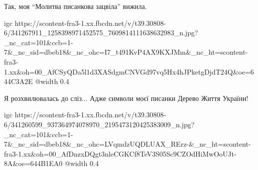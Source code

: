  
 
 
 
 

\qqSecCmt


Так, моя \enquote{Молитва писанкова зацвіла} вижила.

\ifcmt
  igc https://scontent-fra3-1.xx.fbcdn.net/v/t39.30808-6/341267911_1258398971452575_7609814111638632983_n.jpg?_nc_cat=101&ccb=1-7&_nc_sid=dbeb18&_nc_ohc=I7_t491KvP4AX9KXJMm&_nc_ht=scontent-fra3-1.xx&oh=00_AfCSyQDa5l1d3XASdgmCNVGd97vq5Hx4hJPketgDjdT24Q&oe=644C3A2E
	@width 0.4
\fi


Я розхвилювалась до сліз... Адже символи моєї писанки Дерево Життя України!


\ifcmt
  igc https://scontent-fra3-1.xx.fbcdn.net/v/t39.30808-6/341260599_937364974078970_2195473120425383009_n.jpg?_nc_cat=101&ccb=1-7&_nc_sid=dbeb18&_nc_ohc=LVqmdzUQDLUAX_RErz-&_nc_ht=scontent-fra3-1.xx&oh=00_AfDnzxDQgt3nleCGKCf8TeV3S05Sc9CZOdHiMwOoUJt-8A&oe=644B1EA0
	@width 0.4
\fi
